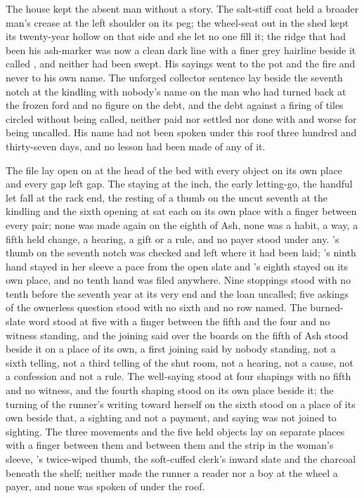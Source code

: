 The house kept the absent man without a story. The salt-stiff coat held a broader man's crease at the left shoulder on its peg; the wheel-seat out in the shed kept its twenty-year hollow on that side and she let no one fill it; the ridge that had been his ash-marker was now a clean dark line with a finer grey hairline beside it called , and neither had been swept. His sayings went to the pot and the fire and never to his own name. The unforged collector sentence lay beside the seventh notch at the kindling with nobody's name on the man who had turned back at the frozen ford and no figure on the debt, and the debt against a firing of tiles circled without being called, neither paid nor settled nor done with and worse for being uncalled. His name had not been spoken under this roof three hundred and thirty-seven days, and no lesson had been made of any of it.

\scenebreak

The file lay open on  at the head of the bed with every object on its own place and every gap left gap. The staying at the inch, the early letting-go, the handful let fall at the rack end, the resting of a thumb on the uncut seventh at the kindling and the sixth opening at  sat each on its own place with a finger between every pair; none was made again on the eighth of Ash, none was a habit, a way, a fifth held change, a hearing, a gift or a rule, and no payer stood under any. 's thumb on the seventh notch was checked and left where it had been laid; 's ninth hand stayed in her sleeve a pace from the open slate and 's eighth stayed on its own place, and no tenth hand was filed anywhere. Nine stoppings stood with no tenth before the seventh year at its very end and the loan uncalled; five askings of the ownerless question stood with no sixth and no row named. The burned-slate word stood at five with a finger between the fifth and the four and no witness standing, and the joining said over the boards on the fifth of Ash stood beside it on a place of its own, a first joining said by nobody standing, not a sixth telling, not a third telling of the shut room, not a hearing, not a cause, not a confession and not a rule. The well-saying stood at four shapings with no fifth and no witness, and the fourth shaping stood on its own place beside it; the turning of the runner's writing toward herself on the sixth stood on a place of its own beside that, a sighting and not a payment, and saying was not joined to sighting. The three movements and the five held objects lay on separate places with a finger between them and between them and the strip in the woman's sleeve, 's twice-wiped thumb, the soft-cuffed clerk's inward slate and the charcoal beneath the shelf; neither made the runner a reader nor a boy at the wheel a payer, and none was spoken of under the roof.

